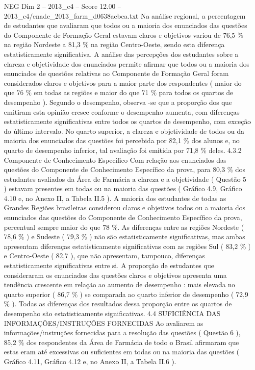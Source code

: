 \begin{textsample}{NEG Dim 2 – 2013\_c4 – Score 12.00 – 2013\_c4/enade\_2013\_farm\_d0638aebea.txt}
Na análise regional, a percentagem de estudantes que avaliaram que todos ou a maioria dos enunciados das questões do Componente de Formação Geral estavam claros e objetivos variou de 76,5 \% na região Nordeste a 81,3 \% na região Centro-Oeste, sendo esta diferença estatisticamente significativa.
A análise das percepções dos estudantes sobre a clareza e objetividade dos enunciados permite afirmar que todos ou a maioria dos enunciados de questões relativas ao Componente de Formação Geral foram considerados claros e objetivos para a maior parte dos respondentes ( maior do que 76 \% em todas as regiões e maior do que 71 \% para todos os quartos de desempenho ).
Segundo o desempenho, observa -se que a proporção dos que emitiram esta opinião cresce conforme o desempenho aumenta, com diferenças estatisticamente significativas entre todos os quartos de desempenho, com exceção do último intervalo.
No quarto superior, a clareza e objetividade de todos ou da maioria dos enunciados das questões foi percebida por 82,1 \% dos alunos e, no quarto de desempenho inferior, tal avaliação foi emitida por 71,8 \% deles. 4.3.2 Componente de Conhecimento Específico Com relação aos enunciados das questões do Componente de Conhecimento Específico da prova, para 80,3 \% dos estudantes avaliados da Área de Farmácia a clareza e a objetividade ( Questão 5 ) estavam presentes em todas ou na maioria das questões ( Gráfico 4.9, Gráfico 4.10 e, no Anexo II, a Tabela II.5 ).
A maioria dos estudantes de todas as Grandes Regiões brasileiras considerou claros e objetivos todos ou a maioria dos enunciados das questões do Componente de Conhecimento Específico da prova, percentual sempre maior do que 78 \%.
As diferenças entre as regiões Nordeste ( 78,6 \% ) e Sudeste ( 79,3 \% ) não são estatisticamente significativas, mas ambas apresentam diferenças estatisticamente significativas com as regiões Sul ( 83,2 \% ) e Centro-Oeste ( 82,7 ), que não apresentam, tampouco, diferenças estatisticamente significativas entre si.
A proporção de estudantes que consideraram os enunciados das questões claros e objetivos apresenta uma tendência crescente em relação ao aumento de desempenho : mais elevada no quarto superior ( 86,7 \% ) se comparada ao quarto inferior de desempenho ( 72,9 \% ).
Todas as diferenças dos resultados dessa proporção entre os quartos de desempenho são estatisticamente significativas. 4.4 SUFICIÊNCIA DAS INFORMAÇÕES/INSTRUÇÕES FORNECIDAS Ao avaliarem as informações/instruções fornecidas para a resolução das questões ( Questão 6 ), 85,2 \% dos respondentes da Área de Farmácia de todo o Brasil afirmaram que estas eram até excessivas ou suficientes em todas ou na maioria das questões ( Gráfico 4.11, Gráfico 4.12 e, no Anexo II, a Tabela II.6 ).

\end{textsample}
